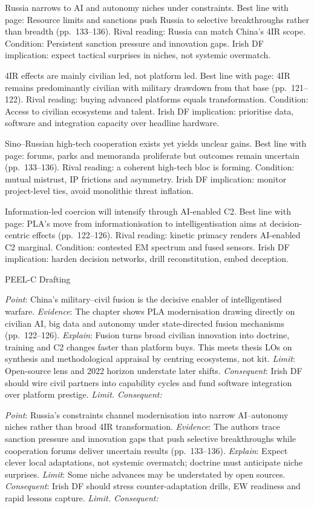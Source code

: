Russia narrows to AI and autonomy niches under constraints.
Best line with page: Resource limits and sanctions push Russia to selective breakthroughs rather than breadth (pp.~133–136).
Rival reading: Russia can match China’s 4IR scope.
Condition: Persistent sanction pressure and innovation gaps.
Irish DF implication: expect tactical surprises in niches, not systemic overmatch.

4IR effects are mainly civilian led, not platform led.
Best line with page: 4IR remains predominantly civilian with military drawdown from that base (pp.~121–122).
Rival reading: buying advanced platforms equals transformation.
Condition: Access to civilian ecosystems and talent.
Irish DF implication: prioritise data, software and integration capacity over headline hardware.

Sino–Russian high-tech cooperation exists yet yields unclear gains.
Best line with page: forums, parks and memoranda proliferate but outcomes remain uncertain (pp.~133–136).
Rival reading: a coherent high-tech bloc is forming.
Condition: mutual mistrust, IP frictions and asymmetry.
Irish DF implication: monitor project-level ties, avoid monolithic threat inflation.

Information-led coercion will intensify through AI-enabled C2.
Best line with page: PLA’s move from informationisation to intelligentisation aims at decision-centric effects (pp.~122–126).
Rival reading: kinetic primacy renders AI-enabled C2 marginal.
Condition: contested EM spectrum and fused sensors.
Irish DF implication: harden decision networks, drill reconstitution, embed deception.

PEEL-C Drafting

\textit{Point}: China’s military–civil fusion is the decisive enabler of intelligentised warfare.
\textit{Evidence}: The chapter shows PLA modernisation drawing directly on civilian AI, big data and autonomy under state-directed fusion mechanisms (pp.~122–126).
\textit{Explain}: Fusion turns broad civilian innovation into doctrine, training and C2 changes faster than platform buys. This meets thesis LOs on synthesis and methodological appraisal by centring ecosystems, not kit.
\textit{Limit}: Open-source lens and 2022 horizon understate later shifts.
\textit{Consequent}: Irish DF should wire civil partners into capability cycles and fund software integration over platform prestige.
\textit{Limit. Consequent:}

\textit{Point}: Russia’s constraints channel modernisation into narrow AI–autonomy niches rather than broad 4IR transformation.
\textit{Evidence}: The authors trace sanction pressure and innovation gaps that push selective breakthroughs while cooperation forums deliver uncertain results (pp.~133–136).
\textit{Explain}: Expect clever local adaptations, not systemic overmatch; doctrine must anticipate niche surprises.
\textit{Limit}: Some niche advances may be understated by open sources.
\textit{Consequent}: Irish DF should stress counter-adaptation drills, EW readiness and rapid lessons capture.
\textit{Limit. Consequent:}

